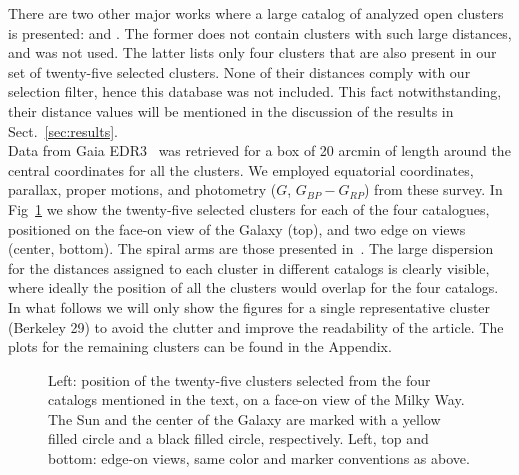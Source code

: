 \documentclass[referee]{aa}
\begin{document}
 There are two other major works where a large catalog of analyzed open clusters
 is presented: \cite{Lui_2019} and \cite{Dias_2021}. The former does not contain
 clusters with such large distances, and was not used. The latter lists
 only four clusters that are also present in our set of twenty-five selected
 clusters. None of their distances comply with our selection filter, hence this
 database was not included. This fact notwithstanding, their distance values will
 be mentioned in the discussion of the results in Sect.~\ref{sec:results}.\\

 Data from Gaia EDR3~\citep{Gaia_2016,Gaia_EDR3} was retrieved for a box of 20
 arcmin of length around the central coordinates for all the clusters. We
 employed equatorial coordinates, parallax, proper motions, and photometry
 ($G$, $G_{BP}-G_{RP}$) from these survey.
 In Fig~\ref{fig:MWmap} we show the twenty-five selected clusters for each of
 the four catalogues, positioned on the face-on view of the Galaxy (top), and
 two edge on views (center, bottom). The spiral arms are those presented
 in~\cite{Momany_2006}. The large dispersion for the distances
 assigned to each cluster in different catalogs is clearly visible, where
 ideally the position of all the clusters would overlap for the four catalogs.\\

 In what follows we will only show the figures for a single representative
 cluster (Berkeley 29) to avoid the clutter and improve the readability of the
 article. The plots for the remaining clusters can be found in the Appendix.

 \begin{figure}
  \caption{Left: position of the twenty-five clusters selected from the four
  catalogs mentioned in the text, on a face-on view of the Milky Way. The Sun
  and the center of the Galaxy are marked with a yellow filled circle and a
  black filled circle, respectively. Left, top and bottom: edge-on views,
  same color and marker conventions as above.}
  \label{fig:MWmap}
 \end{figure}
\end{document}
